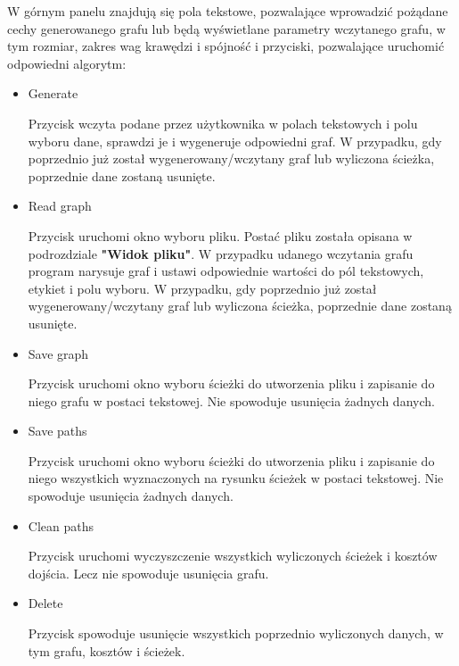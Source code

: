 \documentclass[]{article}
\begin{document}
W górnym panelu znajdują się pola tekstowe, pozwalające wprowadzić pożądane cechy generowanego grafu lub będą wyświetlane parametry wczytanego grafu, w tym rozmiar, zakres wag krawędzi i spójność i przyciski, pozwalające uruchomić odpowiedni algorytm:
\begin{itemize}
    \item Generate
    
    Przycisk wczyta podane przez użytkownika w polach tekstowych i polu wyboru dane, sprawdzi je i wygeneruje odpowiedni graf. W przypadku, gdy poprzednio już został wygenerowany/wczytany graf lub wyliczona ścieżka, poprzednie dane zostaną usunięte.
    
    \item Read graph
    
    Przycisk uruchomi okno wyboru pliku. Postać pliku została opisana w podrozdziale \textbf{"Widok pliku"}. W przypadku udanego wczytania grafu program narysuje graf i ustawi odpowiednie wartości do pól tekstowych, etykiet i polu wyboru. W przypadku, gdy poprzednio już został wygenerowany/wczytany graf lub wyliczona ścieżka, poprzednie dane zostaną usunięte.
    
    \item Save graph
    
    Przycisk uruchomi okno wyboru ścieżki do utworzenia pliku i zapisanie do niego grafu w postaci tekstowej. Nie spowoduje usunięcia żadnych danych.
    \item Save paths
    
    Przycisk uruchomi okno wyboru ścieżki do utworzenia pliku i zapisanie do niego wszystkich wyznaczonych na rysunku ścieżek w postaci tekstowej. Nie spowoduje usunięcia żadnych danych.
    \item Clean paths
    
    Przycisk uruchomi wyczyszczenie wszystkich wyliczonych ścieżek i kosztów dojścia. Lecz nie spowoduje usunięcia grafu.
    \item Delete
    
    Przycisk spowoduje usunięcie wszystkich poprzednio wyliczonych danych, w tym grafu, kosztów i ścieżek.
\end{itemize}
\end{document}
